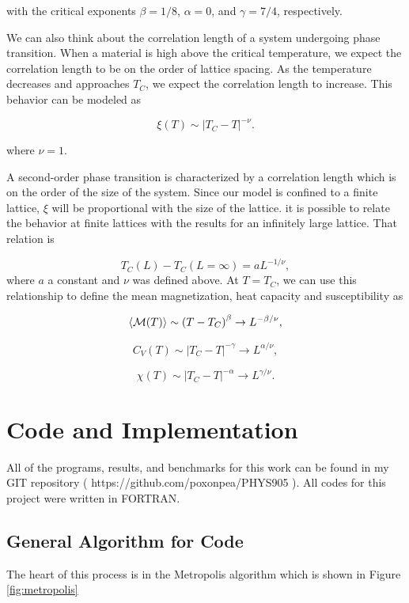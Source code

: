 \documentclass[%
oneside,                 %
final,                   %
10pt]{article}
\begin{document}
with the critical exponents $\beta=1/8$, $\alpha = 0$, and $\gamma = 7/4$, respectively.

We can also think about the correlation length of a system undergoing phase transition.  When a material is high above the critical temperature, we expect the correlation length to be on the order of lattice spacing.  As the temperature decreases and approaches $T_C$, we expect the correlation length to increase. This behavior can be modeled as 

\[
  \xi(T) \sim \left|T_C-T\right|^{-\nu}.
\]

where $\nu=1$.

A second-order phase transition is characterized by a
correlation length which is on the order of the size of the system.
Since our model is confined to a finite lattice, $\xi$ will
be proportional with the size of the lattice.  it is possible to relate the behavior at finite lattices with the results for an infinitely large lattice.
That relation is

\begin{equation}
 T_C(L)-T_C(L=\infty) = aL^{-1/\nu},
\end{equation}
where $a$ a constant and  $\nu$ was defined above.
At $T=T_C$, we can use this relationship to define the mean magnetization, heat capacity and susceptibility as

\[
  \langle {\cal M}(T) \rangle \sim \left(T-T_C\right)^{\beta}
  \rightarrow L^{-\beta/\nu},
\]

\[
  C_V(T) \sim \left|T_C-T\right|^{-\gamma} \rightarrow L^{\alpha/\nu},
\]

\[
  \chi(T) \sim \left|T_C-T\right|^{-\alpha} \rightarrow L^{\gamma/\nu}.
\]


\section{Code and Implementation}

All of the programs, results, and benchmarks for this work can be found in my GIT repository ( https://github.com/poxonpea/PHYS905 ).  All codes for this project were written in FORTRAN.

\subsection{General Algorithm for Code}

The heart of this process is in the Metropolis algorithm which is shown in Figure \ref{fig:metropolis}
\end{document}
